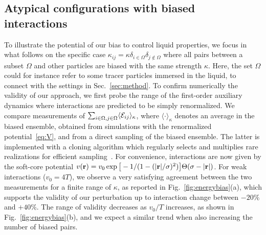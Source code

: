 \documentclass[superscriptaddress, twocolumn, prx, longbibliography, nofootinbib]{revtex4-1}
\begin{document}


\subsection{Atypical configurations with biased interactions}

To illustrate the potential of our bias to control liquid properties, we focus in what follows on the specific case $\kappa_{ij}=\kappa\delta_{i\in\Omega}\delta_{j\not\in\Omega}$ where all pairs between a subset $\Omega$ and other particles are biased with the same strength $\kappa$. Here, the set $\Omega$ could for instance refer to some tracer particles immersed in the liquid, to connect with the settings in Sec.~\ref{sec:method}. To confirm numerically the validity of our approach, we first probe the range of the first-order auxiliary dynamics where interactions are predicted to be simply renormalized. We compare measurements of $\sum_{i\in\Omega, j\in\Omega}\langle{\cal E}_{ij}\rangle_\kappa$, where $\langle\cdot\rangle_\kappa$ denotes an average in the biased ensemble, obtained from simulations with the renormalized potential~\eqref{eq:V}, and from a direct sampling of the biased ensemble. The latter is implemented with a cloning algorithm which regularly selects and multiplies rare realizations for efficient sampling~\cite{Giadina2006, tailleur2007probing, Hurtado2009, Nemoto2016, Ray2018, Klymko2018, Brewer2018}. For convenience, interactions are now given by the soft-core potential $v({\bf r}) = v_0\exp\big[-1 / (1 - (|{\bf r}|/\sigma)^2)\big]\Theta(\sigma-|{\bf r}|)$. For weak interactions ($v_0=4T$), we observe a very satisfying agreement between the two measurements for a finite range of $\kappa$, as reported in Fig.~\ref{fig:energybias}(a), which supports the validity of our perturbation up to interaction change between $-20\%$ and $+40\%$. The range of validity decreases as $v_0/T$ increases, as shown in Fig.~\ref{fig:energybias}(b), and we expect a similar trend when also increasing the number of biased pairs.
\end{document}
